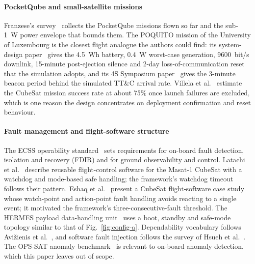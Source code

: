 \documentclass[preprint,12pt]{elsarticle}
\newcommand{\ttc}{TT\&C}
\begin{document}
\paragraph{PocketQube and small-satellite missions} Franzese's survey~\cite{Franzese2025Survey} collects the PocketQube missions flown so far and the sub-1~W power envelope that bounds them. The POQUITO mission of the University of Luxembourg is the closest flight analogue the authors could find: its system-design paper~\cite{Franzese2026POQUITO} gives the 4.5~Wh battery, 0.4~W worst-case generation, 9600~bit/s downlink, 15-minute post-ejection silence and 2-day loss-of-communication reset that the simulation adopts, and its 4S Symposium paper~\cite{Franzese2024POQUITO4S} gives the 3-minute beacon period behind the simulated \ttc{} arrival rate. Villela et al.~\cite{Villela2019Thousandth} estimate the CubeSat mission success rate at about 75\% once launch failures are excluded, which is one reason the design concentrates on deployment confirmation and reset behaviour.

\paragraph{Fault management and flight-software structure} The ECSS operability standard~\cite{ECSS2008Operability} sets requirements for on-board fault detection, isolation and recovery (FDIR) and for ground observability and control. Latachi et al.~\cite{Latachi2020Masat} describe reusable flight-control software for the Masat-1 CubeSat with a watchdog and mode-based safe handling; the framework's watchdog timeout follows their pattern. Eshaq et al.~\cite{Eshaq2025CubeSatFSW} present a CubeSat flight-software case study whose watch-point and action-point fault handling avoids reacting to a single event; it motivated the framework's three-consecutive-fault threshold. The HERMES payload data-handling unit~\cite{Guzman2020HERMES} uses a boot, standby and safe-mode topology similar to that of Fig.~\ref{fig:config-a}. Dependability vocabulary follows Avi\v{z}ienis et al.~\cite{Avizienis2004Dependability}, and software fault injection follows the survey of Hsueh et al.~\cite{Hsueh1997FaultInjection}. The OPS-SAT anomaly benchmark~\cite{Ruszczak2025OPSSAT} is relevant to on-board anomaly detection, which this paper leaves out of scope.
\end{document}
